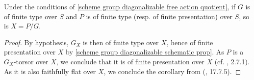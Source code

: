 \begin{corollary}\label{scheme group diagonalizable free action finite condition}
Under the conditions of \cref{scheme group diagonalizable free action quotient}, if $G$ is of finite type over $S$ and $P$ is of finite type (resp. of finite presentation) over $S$, so is $X=P/G$.
\end{corollary}
\begin{proof}
By hypothesis, $G_X$ is then of finite type over $X$, hence of finite presentation over $X$ by \cref{scheme group diagonalizable schematic prop}. As $P$ is a $G_X$-torsor over $X$, we conclude that it is of finite presentation over $X$ (cf. \cite{EGA4-2}, 2.7.1). As it is also faithfully flat over $X$, we conclude the corollary from (\cite{EGA4-4}, 17.7.5).
\end{proof}

